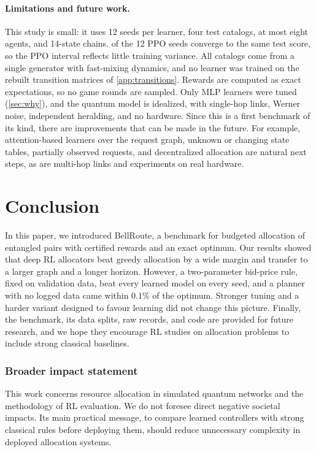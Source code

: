 \documentclass[10pt]{article}
\newcommand{\bellroute}{BellRoute}
\begin{document}
\paragraph{Limitations and future work.} This study is small: it uses 12 seeds per learner, four test catalogs, at most eight agents, and 14-state chains. \cfPpoSame{} of the 12 PPO seeds converge to the same test score, so the PPO interval reflects little training variance. All catalogs come from a single generator with fast-mixing dynamics, and no learner was trained on the rebuilt transition matrices of \cref{app:transitions}. Rewards are computed as exact expectations, so no game rounds are sampled. Only MLP learners were tuned (\cref{sec:why}), and the quantum model is idealized, with single-hop links, Werner noise, independent heralding, and no hardware. Since this is a first benchmark of its kind, there are improvements that can be made in the future. For example, attention-based learners over the request graph, unknown or changing state tables, partially observed requests, and decentralized allocation are natural next steps, as are multi-hop links and experiments on real hardware.

\section{Conclusion}\label{sec:conclusion}

In this paper, we introduced \bellroute{}, a benchmark for budgeted allocation of entangled pairs with certified rewards and an exact optimum. Our results showed that deep RL allocators beat greedy allocation by a wide margin and transfer to a larger graph and a longer horizon. However, a two-parameter bid-price rule, fixed on validation data, beat every learned model on every seed, and a planner with no logged data came within $0.1\%$ of the optimum. Stronger tuning and a harder variant designed to favour learning did not change this picture. Finally, the benchmark, its data splits, raw records, and code are provided for future research, and we hope they encourage RL studies on allocation problems to include strong classical baselines.

\subsubsection*{Broader impact statement}
This work concerns resource allocation in simulated quantum networks and the methodology of RL evaluation. We do not foresee direct negative societal impacts. Its main practical message, to compare learned controllers with strong classical rules before deploying them, should reduce unnecessary complexity in deployed allocation systems.
\end{document}
